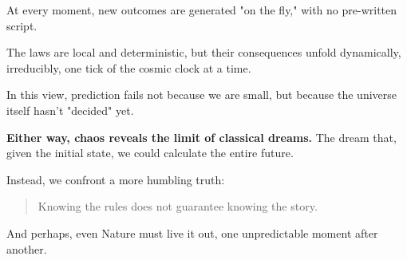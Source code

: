 \begin{tcolorbox}[title=Philosophical Sidebar: Is the Universe Precomputed or Winged on the Fly?, colback=gray!5!white, colframe=black!80!white, breakable, fonttitle=\bfseries]
    At every moment, new outcomes are generated "on the fly," with no pre-written script.
    
    The laws are local and deterministic, but their consequences unfold dynamically, irreducibly, one tick of the cosmic clock at a time.
    
    In this view, prediction fails not because we are small,  
    but because the universe itself hasn’t "decided" yet.
    
    \vspace{0.5em}
    
    \textbf{Either way, chaos reveals the limit of classical dreams.}  
    The dream that, given the initial state, we could calculate the entire future.
    
    Instead, we confront a more humbling truth:
    
    \begin{quote}
    Knowing the rules does not guarantee knowing the story.
    \end{quote}
    
    And perhaps,  
    even Nature must live it out, one unpredictable moment after another.
    
    \end{tcolorbox}
